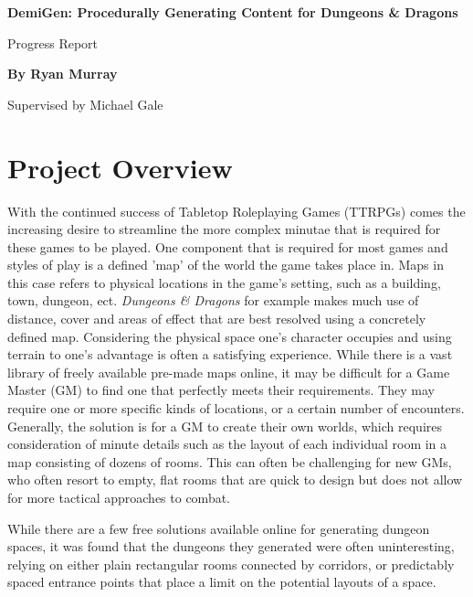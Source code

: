 \documentclass{article}
\begin{document}
\thispagestyle{plain}
\begin{center}
    \Large
    \textbf{DemiGen: Procedurally Generating Content for Dungeons \& Dragons}
 
    \vspace{0.4cm}
    \large
    Progress Report
 
    \vspace{0.4cm}
    \textbf{By Ryan Murray}

    \vspace{0.4cm}
    \large
    Supervised by Michael Gale
\end{center}

\section{Project Overview}

With the continued success of Tabletop Roleplaying Games (TTRPGs) comes the increasing desire to streamline the more complex minutae that is required for these games to be played. One component that is required for most games and styles of play is a defined 'map' of the world the game takes place in. Maps in this case refers to physical locations in the game's setting, such as a building, town, dungeon, ect. \textit{Dungeons \& Dragons} for example makes much use of distance, cover and areas of effect that are best resolved using a concretely defined map. Considering the physical space one's character occupies and using terrain to one's advantage is often a satisfying experience. While there is a vast library of freely available pre-made maps online, it may be difficult for a Game Master (GM) to find one that perfectly meets their requirements. They may require one or more specific kinds of locations, or a certain number of encounters. Generally, the solution is for a GM to create their own worlds, which requires consideration of minute details such as the layout of each individual room in a map consisting of dozens of rooms. This can often be challenging for new GMs, who often resort to empty, flat rooms that are quick to design but does not allow for more tactical approaches to combat. 



While there are a few free solutions available online for generating dungeon spaces, it was found that the dungeons they generated were often uninteresting, relying on either plain rectangular rooms connected by corridors, or predictably spaced entrance points that place a limit on the potential layouts of a space.
\end{document}
